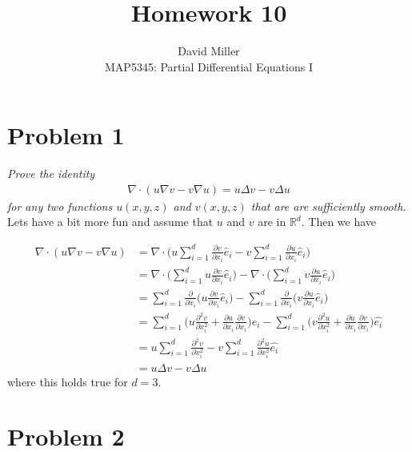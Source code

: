 \documentclass[12pt]{article}
\newcommand{\R}{\mathbb{R}}
\theoremstyle{remark}
\begin{document}
 
\title{Homework 10}
\author{David Miller \\ 
MAP5345: Partial Differential Equations I} 
 
\maketitle

\section*{Problem 1}

\textit{Prove the identity}
\begin{align}
	\nabla \cdot (u\nabla v - v\nabla u) = u \Delta v - v\Delta u
\end{align}
\textit{for any two functions $u(x,y,z)$ and $v(x,y,z)$ that are are sufficiently smooth.} \\

Lets have a bit more fun and assume that $u$ and $v$ are in $\R^d$. Then we have 

\begin{align*}
	\nabla \cdot (u\nabla v - v\nabla u) & = \nabla \cdot \bigg(u\sum\limits_{i=1}^d\frac{\partial v}{\partial x_i}\hat{e}_i - v\sum\limits_{i=1}^d\frac{\partial u}{\partial x_i}\hat{e}_i\bigg) 
	\\ & = \nabla \cdot \bigg( \sum\limits_{i=1}^du\frac{\partial v}{\partial x_i}\hat{e}_i \bigg) - \nabla \cdot \bigg( \sum\limits_{i=1}^dv\frac{\partial u}{\partial x_i}\hat{e}_i \bigg)
	\\ & = \sum\limits_{i=1}^d\frac{\partial}{\partial x_i}\bigg(u\frac{\partial v}{\partial x_i}\hat{e}_i\bigg) - \sum\limits_{i=1}^d\frac{\partial}{\partial x_i}\bigg(v\frac{\partial u}{\partial x_i}\hat{e}_i\bigg) 
	\\ & = \sum\limits_{i=1}^d \bigg(u\frac{\partial^2v}{\partial x_i^2} + \frac{\partial u}{\partial x_i}\frac{\partial v}{\partial x_i}\bigg)\hat{e_i} - \sum\limits_{i=1}^d \bigg(v\frac{\partial^2u}{\partial x_i^2} + \frac{\partial u}{\partial x_i}\frac{\partial v}{\partial x_i}\bigg)\hat{e_i}
	\\ & = u\sum\limits_{i=1}^d \frac{\partial^2v}{\partial x_i^2} - v\sum\limits_{i=1}^d\frac{\partial^2u}{\partial x_i^2}\hat{e_i}
	\\ & = u\Delta v - v\Delta u
\end{align*}
where this holds true for $d = 3$.

\newpage

\section*{Problem 2}
\end{document}
